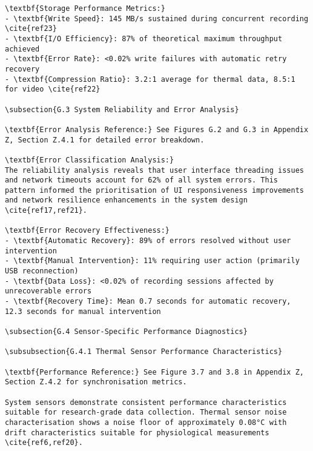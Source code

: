 \begin{verbatim}
\textbf{Storage Performance Metrics:}
- \textbf{Write Speed}: 145 MB/s sustained during concurrent recording \cite{ref23}
- \textbf{I/O Efficiency}: 87% of theoretical maximum throughput achieved
- \textbf{Error Rate}: <0.02% write failures with automatic retry recovery
- \textbf{Compression Ratio}: 3.2:1 average for thermal data, 8.5:1 for video \cite{ref22}

\subsection{G.3 System Reliability and Error Analysis}

\textbf{Error Analysis Reference:} See Figures G.2 and G.3 in Appendix Z, Section Z.4.1 for detailed error breakdown.

\textbf{Error Classification Analysis:}
The reliability analysis reveals that user interface threading issues and network timeouts account for 62% of all system errors. This pattern informed the prioritisation of UI responsiveness improvements and network resilience enhancements in the system design \cite{ref17,ref21}.

\textbf{Error Recovery Effectiveness:}
- \textbf{Automatic Recovery}: 89% of errors resolved without user intervention
- \textbf{Manual Intervention}: 11% requiring user action (primarily USB reconnection)
- \textbf{Data Loss}: <0.02% of recording sessions affected by unrecoverable errors
- \textbf{Recovery Time}: Mean 0.7 seconds for automatic recovery, 12.3 seconds for manual intervention

\subsection{G.4 Sensor-Specific Performance Diagnostics}

\subsubsection{G.4.1 Thermal Sensor Performance Characteristics}

\textbf{Performance Reference:} See Figure 3.7 and 3.8 in Appendix Z, Section Z.4.2 for synchronisation metrics.

System sensors demonstrate consistent performance characteristics suitable for research-grade data collection. Thermal sensor noise characterisation shows a noise floor of approximately 0.08°C with drift characteristics suitable for physiological measurements \cite{ref6,ref20}.


\end{verbatim}
